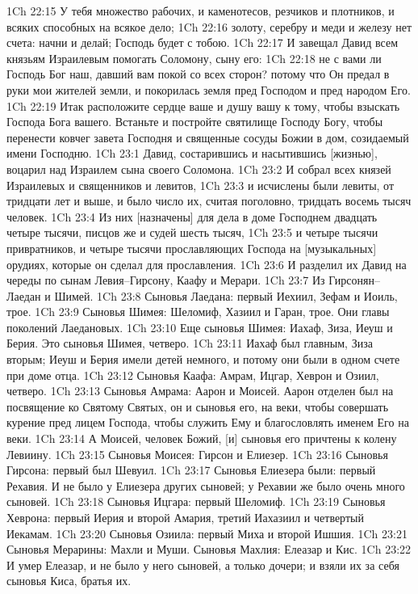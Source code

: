 1Ch 22:15  У тебя множество рабочих, и каменотесов, резчиков и плотников, и всяких способных на всякое дело;
1Ch 22:16  золоту, серебру и меди и железу нет счета: начни и делай; Господь будет с тобою.
1Ch 22:17  И завещал Давид всем князьям Израилевым помогать Соломону, сыну его:
1Ch 22:18  не с вами ли Господь Бог наш, давший вам покой со всех сторон? потому что Он предал в руки мои жителей земли, и покорилась земля пред Господом и пред народом Его.
1Ch 22:19  Итак расположите сердце ваше и душу вашу к тому, чтобы взыскать Господа Бога вашего. Встаньте и постройте святилище Господу Богу, чтобы перенести ковчег завета Господня и священные сосуды Божии в дом, созидаемый имени Господню.
1Ch 23:1  Давид, состарившись и насытившись [жизнью], воцарил над Израилем сына своего Соломона.
1Ch 23:2  И собрал всех князей Израилевых и священников и левитов,
1Ch 23:3  и исчислены были левиты, от тридцати лет и выше, и было число их, считая поголовно, тридцать восемь тысяч человек.
1Ch 23:4  Из них [назначены] для дела в доме Господнем двадцать четыре тысячи, писцов же и судей шесть тысяч,
1Ch 23:5  и четыре тысячи привратников, и четыре тысячи прославляющих Господа на [музыкальных] орудиях, которые он сделал для прославления.
1Ch 23:6  И разделил их Давид на череды по сынам Левия--Гирсону, Каафу и Мерари.
1Ch 23:7  Из Гирсонян--Лаедан и Шимей.
1Ch 23:8  Сыновья Лаедана: первый Иехиил, Зефам и Иоиль, трое.
1Ch 23:9  Сыновья Шимея: Шеломиф, Хазиил и Гаран, трое. Они главы поколений Лаедановых.
1Ch 23:10  Еще сыновья Шимея: Иахаф, Зиза, Иеуш и Берия. Это сыновья Шимея, четверо.
1Ch 23:11  Иахаф был главным, Зиза вторым; Иеуш и Берия имели детей немного, и потому они были в одном счете при доме отца.
1Ch 23:12  Сыновья Каафа: Амрам, Ицгар, Хеврон и Озиил, четверо.
1Ch 23:13  Сыновья Амрама: Аарон и Моисей. Аарон отделен был на посвящение ко Святому Святых, он и сыновья его, на веки, чтобы совершать курение пред лицем Господа, чтобы служить Ему и благословлять именем Его на веки.
1Ch 23:14  А Моисей, человек Божий, [и] сыновья его причтены к колену Левиину.
1Ch 23:15  Сыновья Моисея: Гирсон и Елиезер.
1Ch 23:16  Сыновья Гирсона: первый был Шевуил.
1Ch 23:17  Сыновья Елиезера были: первый Рехавия. И не было у Елиезера других сыновей; у Рехавии же было очень много сыновей.
1Ch 23:18  Сыновья Ицгара: первый Шеломиф.
1Ch 23:19  Сыновья Хеврона: первый Иерия и второй Амария, третий Иахазиил и четвертый Иекамам.
1Ch 23:20  Сыновья Озиила: первый Миха и второй Ишшия.
1Ch 23:21  Сыновья Мерарины: Махли и Муши. Сыновья Махлия: Елеазар и Кис.
1Ch 23:22  И умер Елеазар, и не было у него сыновей, а только дочери; и взяли их за себя сыновья Киса, братья их.

